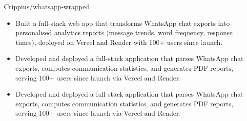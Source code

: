  {}
{
}
{\href{https://github.com/Crippius/whatsapp-wrapped}
{Crippius/whatsapp-wrapped}}
\begin{itemize}

    \ifde
        \item Built a full-stack web app that transforms WhatsApp chat exports into personalised analytics reports (message trends, word frequency, response times), deployed on Vercel and Render with 100+ users since launch.
    \else
        \ifhpc
            \item Developed and deployed a full-stack application that parses WhatsApp chat exports, computes communication statistics, and generates PDF reports, serving 100+ users since launch via Vercel and Render.
        \else
            \item Developed and deployed a full-stack application that parses WhatsApp chat exports, computes communication statistics, and generates PDF reports, serving 100+ users since launch via Vercel and Render.
        \fi
    \fi

\end{itemize}

\medskip
